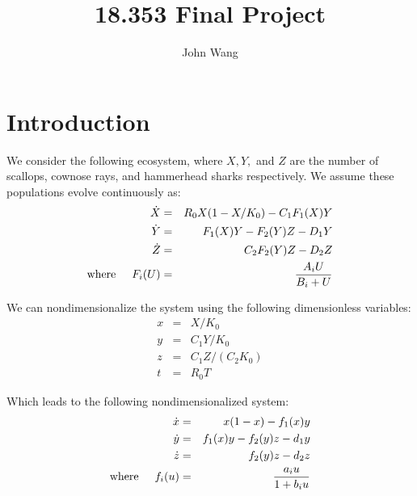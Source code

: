 \documentclass{article}
\begin{document}
\title{18.353 Final Project}
\author{John Wang}
\maketitle


\section{Introduction}

We consider the following ecosystem, where $X,Y,$ and $Z$ are the number of scallops, cownose rays, and hammerhead sharks respectively. We assume these populations evolve continuously as:
\begin{eqnarray}
\dot{X} &=& R_0 X(1 - X/K_0) - C_1 F_1(X) Y \nonumber \\
\dot{Y} &=& F_1 (X) Y - F_2 (Y) Z - D_1 Y \\
\dot{Z} &=& C_2 F_2(Y) Z - D_2 Z \nonumber \\
\mathrm{where} \hspace{0.5cm} F_i(U) &=& \frac{A_i U}{B_i + U} \nonumber
\end{eqnarray}

We can nondimensionalize the system using the following dimensionless variables:
\begin{eqnarray}
x &=& X/K_0 \nonumber \\
y &=& C_1 Y/ K_0 \nonumber \\
z &=& C_1 Z / (C_2 K_0) \\
t &=& R_0 T \nonumber
\end{eqnarray}

Which leads to the following nondimensionalized system:
\begin{eqnarray}
\dot{x} &=& x(1-x) - f_1(x) y \nonumber \\
\dot{y} &=& f_1(x) y - f_2(y) z - d_1 y \\
\dot{z} &=& f_2(y) z - d_2 z \nonumber \\
\mathrm{where} \hspace{0.5cm} f_i(u) &=& \frac{a_i u}{1 + b_i u} \nonumber
\end{eqnarray}
\end{document}
